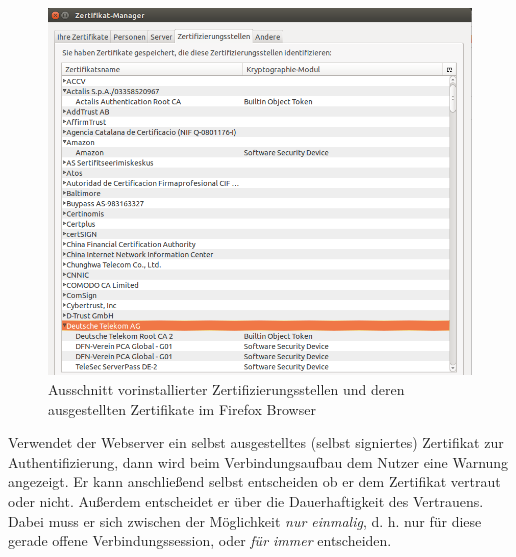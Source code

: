 \begin{figure}[H]
		\centering
		\includegraphics[width=0.65\linewidth]{images/Zertifizierungsstellen.png}
		\caption{Ausschnitt vorinstallierter Zertifizierungsstellen und deren ausgestellten Zertifikate im Firefox Browser}
\end{figure}

Verwendet der Webserver ein selbst ausgestelltes (selbst signiertes) Zertifikat zur Authentifizierung, dann wird beim Verbindungsaufbau dem Nutzer eine Warnung angezeigt. Er kann anschließend selbst entscheiden ob er dem Zertifikat vertraut oder nicht. Außerdem entscheidet er über die Dauerhaftigkeit des Vertrauens. Dabei muss er sich zwischen der Möglichkeit \textit{nur einmalig}, d. h. nur für diese gerade offene Verbindungssession, oder \textit{für immer} entscheiden. 

